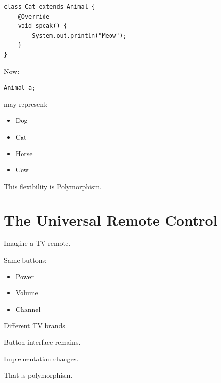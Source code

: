 \documentclass[11pt,a4paper]{book}
\begin{document}

\begin{verbatim}
class Cat extends Animal {
    @Override
    void speak() {
        System.out.println("Meow");
    }
}
\end{verbatim}
\newpage

Now:

\begin{verbatim}
Animal a;
\end{verbatim}

may represent:

\begin{itemize}
\item Dog
\item Cat
\item Horse
\item Cow
\end{itemize}


This flexibility is \textcolor{RosettaRoyalPurple}{Polymorphism}.


\section{The Universal Remote Control}

\begin{mentalmodel}

Imagine a TV remote.


Same buttons:

\begin{itemize}
\item Power
\item Volume
\item Channel
\end{itemize}


Different TV brands.


Button interface remains.

Implementation changes.


That is polymorphism.

\end{mentalmodel}
\end{document}
